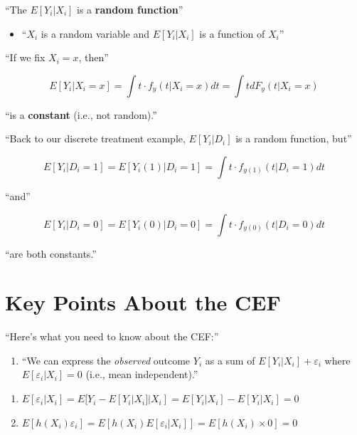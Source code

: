 \documentclass[
  letterpaper,
  DIV=11,
  numbers=noendperiod]{scrreprt}
\providecommand{\tightlist}{%
  \setlength{\itemsep}{0pt}\setlength{\parskip}{0pt}}\usepackage{longtable,booktabs,array}
\theoremstyle{definition}
\theoremstyle{remark}
\begin{document}
``The \(E[Y_i|X_i]\) is a \textbf{random function}''

\begin{itemize}
\tightlist
\item
  ``\(X_i\) is a random variable and \(E[Y_i|X_i]\) is a function of
  \(X_i\)''
\end{itemize}

``If we fix \(X_i=x\), then''

\[
E[Y_i|X_i=x] = \int t \cdot f_y(t|X_i=x)dt = \int t dF_y(t|X_i=x)
\]

``is a \textbf{constant} (i.e., not random).''

``Back to our discrete treatment example, \(E[Y_i|D_i]\) is a random
function, but''

\[
E[Y_i|D_i=1] = E[Y_i(1)|D_i=1] = \int t \cdot f_{y(1)}(t|D_i=1)dt
\]

``and''

\[
E[Y_i|D_i=0] = E[Y_i(0)|D_i=0] = \int t \cdot f_{y(0)}(t|D_i=0)dt
\]

``are both constants.''

\section{Key Points About the CEF}\label{key-points-about-the-cef}

``Here's what you need to know about the CEF:''

\begin{enumerate}
\def\labelenumi{\arabic{enumi}.}
\tightlist
\item
  ``We can express the \emph{observed} outcome \(Y_i\) as a sum of
  \(E[Y_i|X_i]+\varepsilon_i\) where \(E[\varepsilon_i|X_i]=0\) (i.e.,
  mean independent).''
\end{enumerate}

\begin{tcolorbox}[enhanced jigsaw, bottomrule=.15mm, coltitle=black, arc=.35mm, left=2mm, opacityback=0, leftrule=.75mm, colbacktitle=quarto-callout-caution-color!10!white, title=\textcolor{quarto-callout-caution-color}{\faFire}\hspace{0.5em}{Proof}, toprule=.15mm, bottomtitle=1mm, breakable, colframe=quarto-callout-caution-color-frame, opacitybacktitle=0.6, titlerule=0mm, colback=white, rightrule=.15mm, toptitle=1mm]

\begin{enumerate}
\def\labelenumi{\arabic{enumi}.}
\item
  \(E[\varepsilon_i | X_i] = E[Y_i - E[Y_i | X_i] | X_i] = E[Y_i | X_i] - E[Y_i | X_i] = 0\)
\item
  \(E[h(X_i)\varepsilon_i] = E[h(X_i)E[\varepsilon_i | X_i]] = E[h(X_i) \times 0] = 0\)
\end{enumerate}

\end{tcolorbox}
\end{document}
